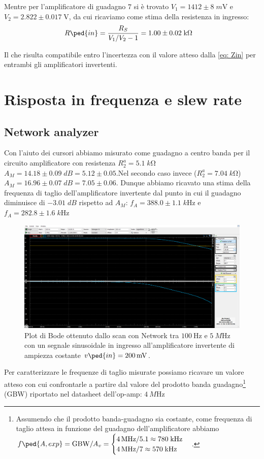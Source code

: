 \documentclass[10pt,a4paper]{article}
\begin{document}
Mentre per l'amplificatore di guadagno $7$ si è trovato
$V_1 = 1412 \pm 8 \; \si{m\V}$ e $V_2 = 2.822 \pm 0.017 \; \si{\V}$, da cui
ricaviamo come stima della resistenza in ingresso:
\begin{align*}
{R\ped{in}} &= \frac{R_S}{V_1/V_2 - 1} = 1.00 \pm 0.02 \; \si{k\ohm}
\end{align*}

Il che risulta compatibile entro l'incertezza con il valore atteso dalla
\eqref{eq: Zin} per entrambi gli amplificatori invertenti.

\section{Risposta in frequenza e slew rate}
\subsection{Network analyzer}
Con l'aiuto dei cursori abbiamo misurato come guadagno a centro banda
per il circuito amplificatore con resistenza $R_2^a = 5.1 \; \si{k\ohm}$
$A_M = 14.18 \pm 0.09 \; \si{dB} = 5.12 \pm 0.05$.Nel secondo caso invece ($R_2^a = 7.04 \; \si{k\ohm}$)$A_M = 16.96 \pm 0.07 \; \si{dB} = 7.05 \pm 0.06$.
Dunque abbiamo ricavato una stima della frequenza di taglio dell'amplificatore
invertente dal punto in cui il guadagno diminuisce di $-3.01 \; \si{dB}$
rispetto ad $A_M$:
$f_A = 388.0 \pm 1.1 \; \si{k\Hz}$ e $f_A = 282.8 \pm 1.6 \; \si{k\Hz}$
\begin{figure}[htbp]
\centering
\includegraphics[scale=0.4]{opampbode}
\caption{Plot di Bode ottenuto dallo scan con Network tra $\SI{100}{\Hz}$ e
$\SI{5}{M\Hz}$ con un segnale sinusoidale in ingresso all'amplificatore
invertente di ampiezza costante $v\ped{in} = \SI{200}{m\V}$. \label{fig: invbode}}
\end{figure}

Per caratterizzare le frequenze di taglio misurate possiamo ricavare un valore
atteso con cui confrontarle a partire dal valore del prodotto banda
guadagno\footnote{Assumendo che il prodotto banda-guadagno sia costante,
come frequenza di taglio attesa in funzione del guadagno dell'amplificatore
abbiamo
$f\ped{A, exp} = \mathrm{GBW}/A_v =
\begin{cases}
\SI{4}{M\Hz} / 5.1 \approx 780 \; \si{k\Hz} \\
\SI{4}{M\Hz} / 7 \approx 570 \; \si{k\Hz}
\end{cases}$.}
(GBW) riportato nel datasheet dell'op-amp: $\SI{4}{M\Hz}$
\end{document}
